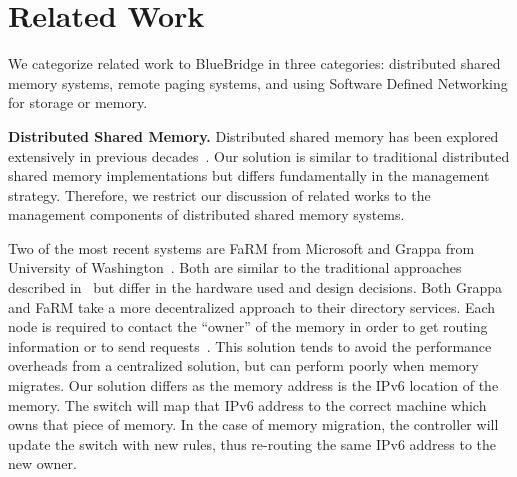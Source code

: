 \section{Related Work}%
\label{sec:related}
We categorize related work to BlueBridge in three categories: distributed shared memory systems, remote paging systems, and using Software Defined Networking for storage or memory.

\textbf{Distributed Shared Memory.} 
Distributed shared memory has been explored extensively in previous decades~\cite{treadmarks, gms, Protic1996, Nitzberg1991, grappa, farm}. Our solution is similar to traditional distributed shared memory implementations but differs fundamentally in the management strategy. Therefore, we restrict our discussion of related works to the management components of distributed shared memory systems.

Two of the most recent systems are FaRM from Microsoft\cite{farm} and Grappa from University of Washington~\cite{grappa}. Both are similar to the traditional approaches described in~\cite{Protic1996, Nitzberg1991} but differ in the hardware used and design decisions. Both Grappa and FaRM take a more decentralized approach to their directory services. Each node is required to contact the ``owner'' of the memory in order to get routing information or to send requests~\cite{grappa, farm}. This solution tends to avoid the performance overheads from a centralized solution, but can perform poorly when memory migrates. Our solution differs as the memory address is the IPv6 location of the memory. The switch will map that IPv6 address to the correct machine which owns that piece of memory. In the case of memory migration, the controller will update the switch with new rules, thus re-routing the same IPv6 address to the new owner.



